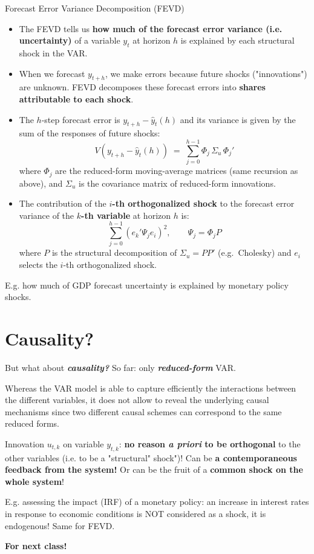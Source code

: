 \documentclass{beamer}
\begin{document}
\begin{frame}{Forecast Error Variance Decomposition (FEVD)}
\footnotesize
\begin{itemize}
    \item The FEVD tells us \textbf{how much of the forecast error variance (i.e. uncertainty)} of a variable $y_{t}$ at horizon $h$ is explained by each structural shock in the VAR.

    \item When we forecast $y_{t+h}$, we make errors because future shocks ("innovations") are unknown. FEVD decomposes these forecast errors into \textbf{shares attributable to each shock}.
    
    \item The $h$-step forecast error is $y_{t+h} - \hat{y}_t(h)$  and its variance is given by the sum of the responses of future shocks:
    \[
       V\!\left(y_{t+h} - \hat{y}_t(h)\right)
       \;=\;
       \sum_{j=0}^{h-1} \Phi_j \, \Sigma_u \, \Phi_j'
    \]
    where $\Phi_j$ are the reduced-form moving-average matrices (same recursion as above), and $\Sigma_u$ is the covariance matrix of reduced-form innovations.

    \item The contribution of the \textbf{$i$-th orthogonalized shock} to the forecast error variance of the 
    \textbf{$k$-th variable} at horizon $h$ is:
    \[
       \sum_{j=0}^{h-1} 
       \left( e_k' \Psi_j e_i \right)^{\!2},
       \qquad \Psi_j = \Phi_j P
    \]
    where $P$ is the structural decomposition of $\Sigma_u = PP'$ (e.g.\ Cholesky) and $e_i$ selects the $i$-th orthogonalized shock.%
\end{itemize}

E.g. how much of GDP forecast uncertainty is explained by monetary policy shocks.

\end{frame}


\section{Causality?}

\begin{frame}{But what about \textit{\textbf{causality?}}}
So far: only \textit{\textbf{reduced-form}} VAR.
\medskip

Whereas the VAR model is able to capture efficiently the interactions between the different variables, it does not allow to reveal the underlying causal mechanisms since two different causal schemes can correspond to the same reduced forms.
\medskip

Innovation $u_{t,k}$ on variable $y_{t,k}$:\textbf{ no reason \textit{a priori} to be orthogonal} to the other variables (i.e. to be a "structural" shock")! Can be\textbf{ a contemporaneous feedback from the system!} Or can be the fruit of a \textbf{common shock on the whole system}!
\medskip

E.g. assessing the impact (IRF) of a monetary policy: an increase in interest rates in response to economic conditions is NOT considered as a shock, it is endogenous! Same for FEVD.
\medskip

\textbf{For next class!}
\end{frame}
\end{document}

